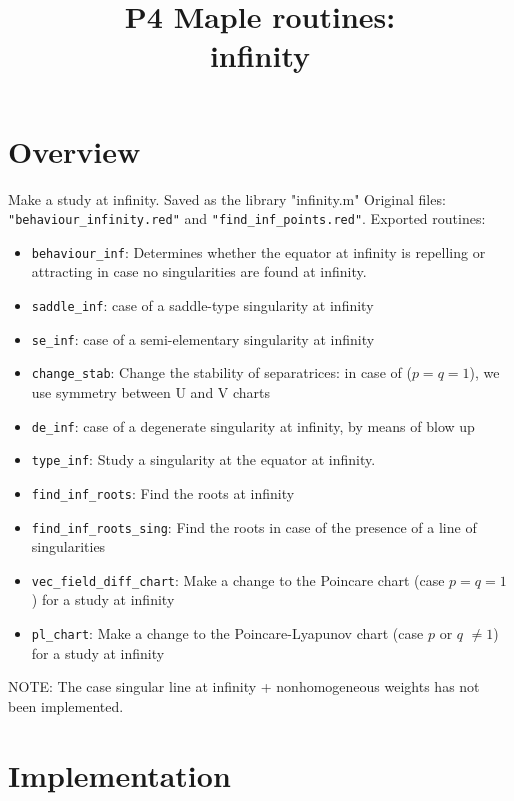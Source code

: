 \documentclass[a4paper,10pt]{article}
\title{P4 Maple routines:\\infinity}
\author{}
\date{}
\begin{document}
\maketitle

\section{Overview}

Make a study at infinity.  Saved as the library "infinity.m"
Original files: \verb+"behaviour_infinity.red"+ and \verb+"find_inf_points.red"+.
Exported routines:
\begin{itemize}
\item \verb+behaviour_inf+:     Determines whether the equator at infinity is repelling or
                                attracting in case no singularities are found at infinity.
\item \verb+saddle_inf+:        case of a saddle-type singularity at infinity
\item \verb+se_inf+:            case of a semi-elementary singularity at infinity
\item \verb+change_stab+:       Change the stability of separatrices: in case of ($p=q=1$), we use symmetry
                                between U and V charts
\item \verb+de_inf+:            case of a degenerate singularity at infinity, by means of blow up
\item \verb+type_inf+:          Study a singularity at the equator at infinity.
\item \verb+find_inf_roots+:    Find the roots at infinity
\item \verb+find_inf_roots_sing+: Find the roots in case of the presence of a line of singularities
\item \verb+vec_field_diff_chart+: Make a change to the Poincare chart (case $p=q=1$) for a study at infinity
\item \verb+pl_chart+:          Make a change to the Poincare-Lyapunov chart (case $p$ or $q$ $\not=1$)
                                for a study at infinity
\end{itemize}

NOTE: The case singular line at infinity + nonhomogeneous weights has not been implemented.

\section{Implementation}
\end{document}

